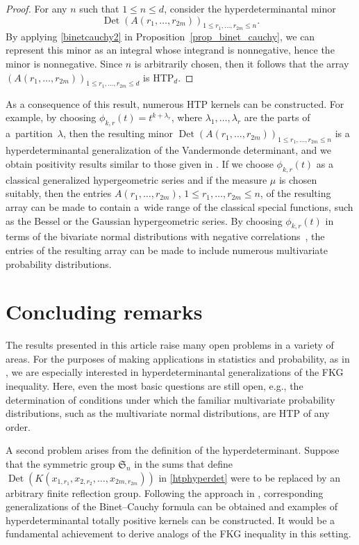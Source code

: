 \documentclass[pdftex]{sigma}
\numberwithin{equation}{section}
\def\Det{\operatorname{Det}}
\def\frS{\mathfrak{S}}
\begin{document}
\begin{proof}
For any $n$ such that $1 \le n \le d$, consider the hyperdeterminantal minor
\[
\Det(A(r_1,\dots,r_{2m}))_{1 \le r_1,\dots,r_{2m} \le n}.
\]
By applying \eqref{binetcauchy2} in Proposition~\ref{prop_binet_cauchy}, we can represent this minor as an integral whose integrand is nonnegative, hence the minor is nonnegative. Since $n$ is arbitrarily chosen, then it follows that the array $(A(r_1,\dots,r_{2m}))_{1 \le r_1,\dots,r_{2m} \le d}$ is HTP$_d$.
\end{proof}

As a consequence of this result, numerous HTP kernels can be constructed. For example, by choosing $\phi_{k,r}(t) = t^{k+\lambda_r}$, where $\lambda_1,\dots,\lambda_r$ are the parts of a~partition~$\lambda$, then the resulting minor $\Det(A(r_1,\dots,r_{2m}))_{1 \le r_1,\dots,r_{2m} \le n}$ is a hyperdeterminantal generalization of the Vandermonde determinant, and we obtain positivity results similar to those given in \cite{wanglixu}. If we choose $\phi_{k,r}(t)$ as a classical generalized hypergeometric series and if the measure $\mu$ is chosen suitably, then the entries $A(r_1,\dots,r_{2m})$, $1 \le r_1,\dots,r_{2m} \le n$, of the resulting array can be made to contain a~wide range of the classical special functions, such as the Bessel or the Gaussian hypergeometric series. By choosing $\phi_{k,r}(t)$ in terms of the bivariate normal distributions with negative correlations~\cite{karlinrinott80}, the entries of the resulting array can be made to include numerous multivariate probability distributions.


\section{Concluding remarks}
\label{sec_conclusions}

The results presented in this article raise many open problems in a variety of areas. For the purposes of making applications in statistics and probability, as in \cite{karlinrinott80}, we are especially interested in hyperdeterminantal generalizations of the FKG inequality. Here, even the most basic questions are still open, e.g., the determination of conditions under which the familiar multivariate probability distributions, such as the multivariate normal distributions, are HTP of any order.

A second problem arises from the definition of the hyperdeterminant. Suppose that the symmetric group $\frS_n$ in the sums that define $\Det(K(x_{1,r_1},x_{2,r_2},\dots,x_{2m,r_{2m}}))$ in \eqref{htphyperdet} were to be replaced by an arbitrary finite reflection group. Following the approach in \cite{grossrichards95}, corresponding generalizations of the Binet--Cauchy formula can be obtained and examples of hyperdeterminantal totally positive kernels can be constructed. It would be a fundamental achievement to derive analogs of the FKG inequality in this setting.
\end{document}
